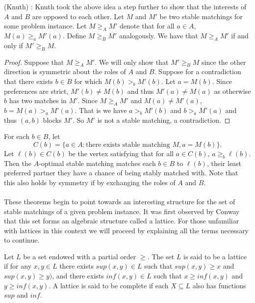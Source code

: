 \begin{theorem} (Knuth) \cite{knuthmariages}: Knuth took the above idea a step further to show that the interests of $A$ and $B$ are opposed to each other. Let $M$ and $M'$ be two stable matchings for some problem instance. Let $M \geq_A M'$ denote that for all $a \in A$, $M(a) \geq_a M'(a)$. Define $M \geq_B M'$ analogously. We have that $M \geq_A M'$ if and only if $M' \geq_B M$.
\end{theorem}
\begin{proof}
Suppose that $M \geq_A M'$. We will only show that $M' \geq_B M$ since the other direction is symmetric about the roles of $A$ and $B$. Suppose for a contradiction that there exists $b \in B$ for which $M(b) >_b M'(b)$. Let $a = M(b)$. Since preferences are strict, $M'(b) \neq M(b)$ and thus $M'(a) \neq M(a)$ as otherwise $b$ has two matches in $M'$. Since $M \geq_A M'$ and $M(a) \neq M'(a)$, $b=M(a) >_a M'(a)$. That is we have $a >_b M'(b)$ and $b >_a M'(a)$ and thus $(a,b)$ blocks $M'$. So $M'$ is not a stable matching, a contradiction. \end{proof}
\begin{corollary}For each $b \in B$, let $$C(b) = \{a \in A: \text{there exists stable matching }M, a = M(b)\}.$$ Let $\ell(b) \in C(b)$  be the vertex satisfying that for all $a \in C(b)$, $a \geq_b \ell(b)$. Then the $A$-optimal stable matching matches each $b \in B$ to $\ell(b)$, their least preferred partner they have a chance of being stably matched with. Note that this also holds by symmetry if by exchanging the roles of $A$ and $B$.
\end{corollary}
\paragraph{}
These theorems begin to point towards an interesting structure for the set of stable matchings of a given problem instance. It was first observed by Conway \cite{knuthmariages} that this set forms an algebraic structure called a lattice. For those unfamiliar with lattices in this context we will proceed by explaining all the terms necessary to continue.
\begin{definition}
Let $L$ be a set endowed with a partial order $\geq$. The set $L$ is said to be a lattice if for any $x, y \in L$ there exists $sup(x,y) \in L$ such that $sup(x,y) \geq x$ and $sup(x,y) \geq y)$, and there exists $inf(x,y) \in L$ such that $x \geq inf(x,y)$ and $y \geq inf(x,y)$. A lattice is said to be complete if each $X \subseteq L$ also has functions $sup$ and $inf$. 
\end{definition}
